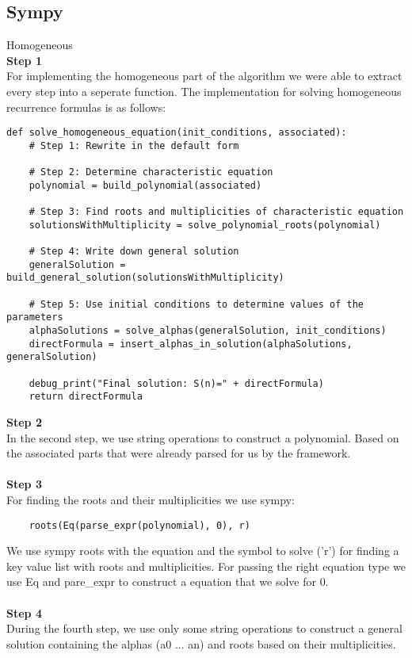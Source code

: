\documentclass{article}
\begin{document}
\subsection{Sympy}
Homogeneous\\
\newline
\textbf{Step 1} \\
For implementing the homogeneous part of the algorithm we were able to extract every step into a seperate function. The implementation for solving homogeneous recurrence formulas is as follows:
\begin{lstlisting}
def solve_homogeneous_equation(init_conditions, associated):
    # Step 1: Rewrite in the default form

    # Step 2: Determine characteristic equation
    polynomial = build_polynomial(associated)

    # Step 3: Find roots and multiplicities of characteristic equation
    solutionsWithMultiplicity = solve_polynomial_roots(polynomial)

    # Step 4: Write down general solution
    generalSolution = build_general_solution(solutionsWithMultiplicity)

    # Step 5: Use initial conditions to determine values of the parameters
    alphaSolutions = solve_alphas(generalSolution, init_conditions)
    directFormula = insert_alphas_in_solution(alphaSolutions, generalSolution)

    debug_print("Final solution: S(n)=" + directFormula)
    return directFormula
\end{lstlisting}
\textbf{Step 2}\\
In the second step, we use string operations to construct a polynomial. Based on the associated parts that were already parsed for us by the framework.\\
\\
\textbf{Step 3}\\
For finding the roots and their multiplicities we use sympy:
\begin{verbatim}
    roots(Eq(parse_expr(polynomial), 0), r)
\end{verbatim}
We use sympy roots with the equation and the symbol to solve ('r') for finding a key value list with roots and multiplicities. For passing the right equation type we use Eq and pare\_expr to construct a equation that we solve for 0.\\
\\
\textbf{Step 4}\\
During the fourth step, we use only some string operations to construct a general solution containing the alphas (a0 ... an) and roots based on their multiplicities.\\
\end{document}
